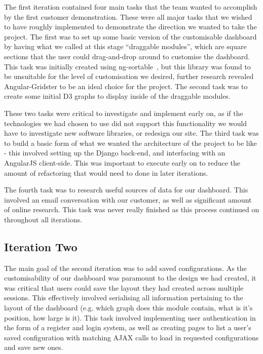 \documentclass{l3proj}
\begin{document}
The first iteration contained four main tasks that the team wanted to accomplish by the first customer demonstration. These were all major tasks that we wished to have roughly implemented to demonstrate the direction we wanted to take the project. The first was to set up some basic version of the customisable dashboard by having what we called at this stage ``draggable modules'', which are square sections that the user could drag-and-drop around to customise the dashboard. This task was initially created using ng-sortable~\cite{NGSortable}, but this library was found to be unsuitable for the level of customisation we desired, further research revealed Angular-Gridster to be an ideal choice for the project. The second task was to create some initial D3 graphs to display inside of the draggable modules.

These two tasks were critical to investigate and implement early on, as if the technologies we had chosen to use did not support this functionality we would have to investigate new software libraries, or redesign our site. The third task was to build a basic form of what we wanted the architecture of the project to be like - this involved setting up the Django back-end, and interfacing with an AngularJS client-side. This was important to execute early on to reduce the amount of refactoring that would need to done in later iterations.

The fourth task was to research useful sources of data for our dashboard. This involved an email conversation with our customer, as well as significant amount of online research. This task was never really finished as this process continued on throughout all iterations.

\subsection{Iteration Two}
\label{sec:development:iteration-Two}

The main goal of the second iteration was to add saved configurations. As the customisability of our dashboard was paramount to the design we had created, it was critical that users could save the layout they had created across multiple sessions. This effectively involved serialising all information pertaining to the layout of the dashboard (e.g. which graph does this module contain, what is it's position, how large is it). This task involved implementing user authentication in the form of a register and login system, as well as creating pages to list a user's saved configuration with matching AJAX calls to load in requested configurations and save new ones.
\end{document}
